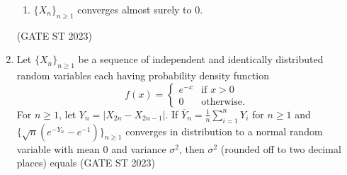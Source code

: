 \begin{enumerate}[label=\thechapter.\arabic*,ref=\thechapter.\theenumi]
\begin{enumerate}[label=(\Alph*)]
\item $\{X_n\}_{n \geq 1}$ converges almost surely to 0.
\end{enumerate}
\hfill (GATE ST 2023) 
\\
%
\item Let $\{X_n\}_{n \geq 1}$ be a sequence of independent and identically distributed random variables each having probability density function
\[
f(x) = 
\begin{cases}
  e^{-x} & \text{if } x > 0 \\
  0 & \text{otherwise}.
\end{cases}
\]
For $n \geq 1$, let $Y_n = |X_{2n} - X_{2n-1}|$. If $\overline{Y}_n = \frac{1}{n} \sum_{i=1}^{n} Y_i$ for $n \geq 1$ and $\{\sqrt{n} (e^{-\overline{Y}_n} - e^{-1})\}_{n \geq 1}$ converges in distribution to a normal random variable with mean $0$ and variance $\sigma^2$, then $\sigma^2$ (rounded off to two decimal places) equals 
\hfill (GATE ST 2023) 
\\

\end{enumerate}
